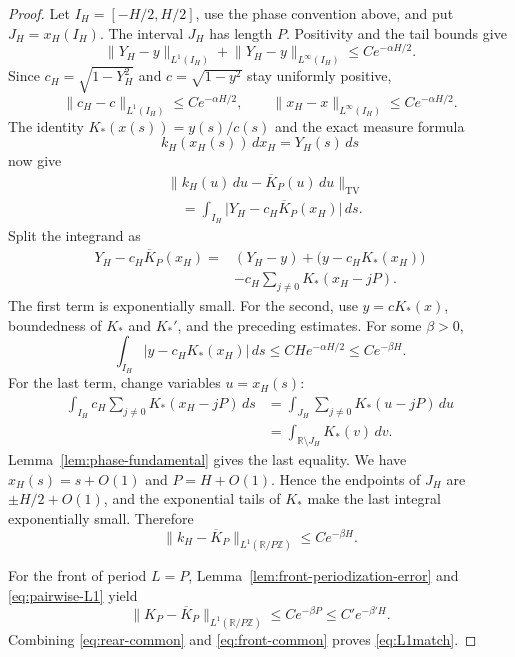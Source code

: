 \documentclass[11pt]{article}
\theoremstyle{remark}
\newcommand{\R}{\mathbb R}
\newcommand{\abs}[1]{\lvert #1\rvert}
\newcommand{\norm}[1]{\lVert #1\rVert}
\begin{document}
\begin{proof}
Let $I_H=[-H/2,H/2]$, use the phase convention above, and put
$J_H=x_H(I_H)$.  The interval $J_H$ has length $P$.  Positivity and the tail
bounds give
\[
  \norm{Y_H-y}_{L^1(I_H)}+
  \norm{Y_H-y}_{L^\infty(I_H)}\leq Ce^{-\alpha H/2}.
\]
Since $c_H=\sqrt{1-Y_H^2}$ and $c=\sqrt{1-y^2}$ stay uniformly positive,
\[
  \norm{c_H-c}_{L^1(I_H)}\leq Ce^{-\alpha H/2},
  \qquad
  \norm{x_H-x}_{L^\infty(I_H)}\leq Ce^{-\alpha H/2}.
\]
The identity $K_*(x(s))=y(s)/c(s)$ and the exact measure formula
\begin{equation}\label{eq:rear-measure}
  k_H(x_H(s))\,dx_H=Y_H(s)\,ds
\end{equation}
now give
\[
\begin{aligned}
&\norm{k_H(u)\,du-\overline K_P(u)\,du}_{\mathrm{TV}}\\
&\quad=
\int_{I_H}\abs{Y_H-c_H\overline K_P(x_H)}\,ds.
\end{aligned}
\]
Split the integrand as
\[
\begin{aligned}
Y_H-c_H\overline K_P(x_H)
={}&(Y_H-y)
 +\bigl(y-c_HK_*(x_H)\bigr)\\
&-c_H\sum_{j\ne0}K_*(x_H-jP).
\end{aligned}
\]
The first term is exponentially small.  For the second, use
\(y=cK_*(x)\), boundedness of \(K_*\) and \(K_*'\), and the preceding
estimates.  For some \(\beta>0\),
\[
 \int_{I_H}|y-c_HK_*(x_H)|\,ds
 \leq CH e^{-\alpha H/2}
 \leq Ce^{-\beta H}.
\]
For the last term, change variables $u=x_H(s)$:
\[
\begin{aligned}
\int_{I_H}c_H\sum_{j\ne0}K_*(x_H-jP)\,ds
&=\int_{J_H}\sum_{j\ne0}K_*(u-jP)\,du\\
&=\int_{\R\setminus J_H}K_*(v)\,dv.
\end{aligned}
\]
Lemma~\ref{lem:phase-fundamental} gives the last equality.  We have \(x_H(s)=s+O(1)\) and
\(P=H+O(1)\).  Hence the endpoints of \(J_H\) are \(\pm H/2+O(1)\),
and the exponential tails of \(K_*\) make the last integral exponentially
small.  Therefore
\begin{equation}\label{eq:rear-common}
  \norm{k_H-\overline K_P}_{L^1(\R/P\mathbb Z)}
  \leq Ce^{-\beta H}.
\end{equation}

For the front of period \(L=P\),
Lemma~\ref{lem:front-periodization-error} and
\eqref{eq:pairwise-L1} yield
\begin{equation}\label{eq:front-common}
  \norm{K_P-\overline K_P}_{L^1(\R/P\mathbb Z)}
  \leq Ce^{-\beta P}\leq C'e^{-\beta'H}.
\end{equation}
Combining \eqref{eq:rear-common} and \eqref{eq:front-common} proves
\eqref{eq:L1match}.
\end{proof}
\end{document}
